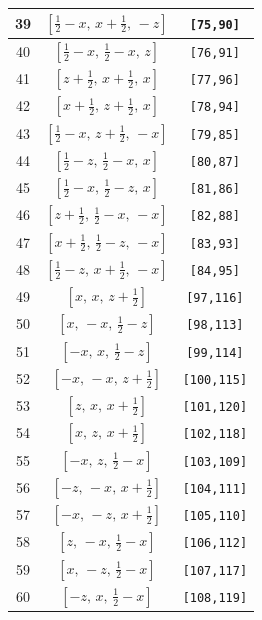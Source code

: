 \documentclass[fleqn,8pt]{jsarticle}
\begin{document}
\begin{longtable}{ccc}
39 & $\left[ \frac{1}{2} - x,\, x + \frac{1}{2},\, - z \right]$ & {\tt [75,90]} \\ \hline
40 & $\left[ \frac{1}{2} - x,\, \frac{1}{2} - x,\, z \right]$ & {\tt [76,91]} \\ \hline
41 & $\left[ z + \frac{1}{2},\, x + \frac{1}{2},\, x \right]$ & {\tt [77,96]} \\ \hline
42 & $\left[ x + \frac{1}{2},\, z + \frac{1}{2},\, x \right]$ & {\tt [78,94]} \\ \hline
43 & $\left[ \frac{1}{2} - x,\, z + \frac{1}{2},\, - x \right]$ & {\tt [79,85]} \\ \hline
44 & $\left[ \frac{1}{2} - z,\, \frac{1}{2} - x,\, x \right]$ & {\tt [80,87]} \\ \hline
45 & $\left[ \frac{1}{2} - x,\, \frac{1}{2} - z,\, x \right]$ & {\tt [81,86]} \\ \hline
46 & $\left[ z + \frac{1}{2},\, \frac{1}{2} - x,\, - x \right]$ & {\tt [82,88]} \\ \hline
47 & $\left[ x + \frac{1}{2},\, \frac{1}{2} - z,\, - x \right]$ & {\tt [83,93]} \\ \hline
48 & $\left[ \frac{1}{2} - z,\, x + \frac{1}{2},\, - x \right]$ & {\tt [84,95]} \\ \hline
49 & $\left[ x,\, x,\, z + \frac{1}{2} \right]$ & {\tt [97,116]} \\ \hline
50 & $\left[ x,\, - x,\, \frac{1}{2} - z \right]$ & {\tt [98,113]} \\ \hline
51 & $\left[ - x,\, x,\, \frac{1}{2} - z \right]$ & {\tt [99,114]} \\ \hline
52 & $\left[ - x,\, - x,\, z + \frac{1}{2} \right]$ & {\tt [100,115]} \\ \hline
53 & $\left[ z,\, x,\, x + \frac{1}{2} \right]$ & {\tt [101,120]} \\ \hline
54 & $\left[ x,\, z,\, x + \frac{1}{2} \right]$ & {\tt [102,118]} \\ \hline
55 & $\left[ - x,\, z,\, \frac{1}{2} - x \right]$ & {\tt [103,109]} \\ \hline
56 & $\left[ - z,\, - x,\, x + \frac{1}{2} \right]$ & {\tt [104,111]} \\ \hline
57 & $\left[ - x,\, - z,\, x + \frac{1}{2} \right]$ & {\tt [105,110]} \\ \hline
58 & $\left[ z,\, - x,\, \frac{1}{2} - x \right]$ & {\tt [106,112]} \\ \hline
59 & $\left[ x,\, - z,\, \frac{1}{2} - x \right]$ & {\tt [107,117]} \\ \hline
60 & $\left[ - z,\, x,\, \frac{1}{2} - x \right]$ & {\tt [108,119]} \\ \hline

\end{longtable}
\end{document}
